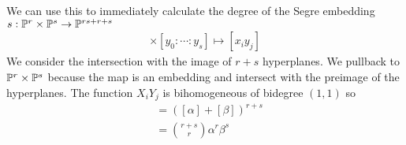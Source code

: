 \documentclass[12pt]{article}
\begin{document}
\begin{example}
    We can use this to immediately calculate the degree of the Segre embedding $s:\P^r\times \P^s \to \P^{rs+r+s}$ \begin{align*}
        [x_0:\cdots:x_r]\times [y_0:\cdots:y_s] \mapsto [x_iy_j]
    \end{align*}
    We consider the intersection with the image of $r+s$ hyperplanes. We pullback to $\P^r\times\P^s$
    because the map is an embedding and intersect with the preimage of the hyperplanes. The function $X_iY_j$ is bihomogeneous
    of bidegree $(1,1)$ so \begin{align*}
        [S_{r,s}] &= ([\alpha] + [\beta])^{r+s} \\
        &= \binom{r+s}{r}\alpha^r\beta^s
    \end{align*}
\end{example}
\end{document}
